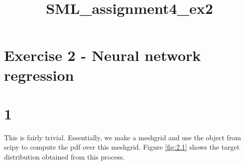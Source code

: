 \documentclass[11pt]{article}
\title{SML\_assignment4\_ex2}
\begin{document}
    
    
    \maketitle
    
    

    
    \section{Exercise 2 - Neural network
regression}\label{exercise-2---neural-network-regression}

    \section{1}\label{section}
	This is fairly trivial. Essentially, we make a meshgrid and use the object from scipy to compute the pdf over this meshgrid. Figure \ref{fig:2.1} shows the target distribution obtained from this process. 
		
\end{document}
